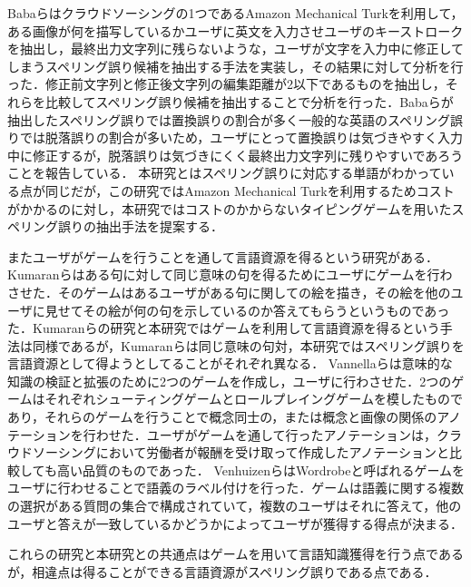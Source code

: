 Babaらはクラウドソーシングの1つであるAmazon Mechanical Turkを利用して，ある画像が何を描写しているかユーザに英文を入力させユーザのキーストロークを抽出し，最終出力文字列に残らないような，ユーザが文字を入力中に修正してしまうスペリング誤り候補を抽出する手法を実装し，その結果に対して分析を行った\cite{babaACL2012}．修正前文字列と修正後文字列の編集距離が2以下であるものを抽出し，それらを比較してスペリング誤り候補を抽出することで分析を行った．Babaらが抽出したスペリング誤りでは置換誤りの割合が多く一般的な英語のスペリング誤りでは脱落誤りの割合が多いため，ユーザにとって置換誤りは気づきやすく入力中に修正するが，脱落誤りは気づきにくく最終出力文字列に残りやすいであろうことを報告している．
本研究とはスペリング誤りに対応する単語がわかっている点が同じだが，この研究ではAmazon Mechanical Turkを利用するためコストがかかるのに対し，本研究ではコストのかからないタイピングゲームを用いたスペリング誤りの抽出手法を提案する．

またユーザがゲームを行うことを通して言語資源を得るという研究がある．Kumaranらはある句に対して同じ意味の句を得るためにユーザにゲームを行わさせた\cite{kumaranCOLING2014}．そのゲームはあるユーザがある句に関しての絵を描き，その絵を他のユーザに見せてその絵が何の句を示しているのか答えてもらうというものであった．Kumaranらの研究と本研究ではゲームを利用して言語資源を得るという手法は同様であるが，Kumaranらは同じ意味の句対，本研究ではスペリング誤りを言語資源として得ようとしてることがそれぞれ異なる．
Vannellaらは意味的な知識の検証と拡張のために2つのゲームを作成し，ユーザに行わさせた\cite{vannella2014validating}．2つのゲームはそれぞれシューティングゲームとロールプレイングゲームを模したものであり，それらのゲームを行うことで概念同士の，または概念と画像の関係のアノテーションを行わせた．ユーザがゲームを通して行ったアノテーションは，クラウドソーシングにおいて労働者が報酬を受け取って作成したアノテーションと比較しても高い品質のものであった．
VenhuizenらはWordrobeと呼ばれるゲームをユーザに行わせることで語義のラベル付けを行った\cite{venhuizen2013gamification}．ゲームは語義に関する複数の選択がある質問の集合で構成されていて，複数のユーザはそれに答えて，他のユーザと答えが一致しているかどうかによってユーザが獲得する得点が決まる．
\begin{comment}
得られたデータの量は比較的少なかったが，適合率と再現率の結果は期待できるものであるとしている．
\end{comment}
これらの研究と本研究との共通点はゲームを用いて言語知識獲得を行う点であるが，相違点は得ることができる言語資源がスペリング誤りである点である．

